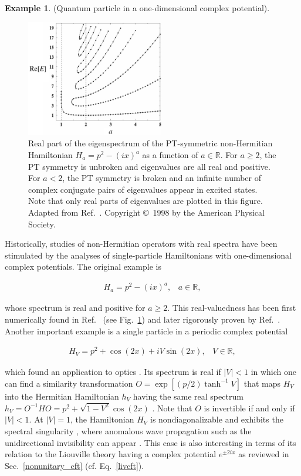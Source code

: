 \documentclass{tADP2e}
\theoremstyle{plain}
\newcommand{\eqn}[1]{
\begin{eqnarray}
	#1
\end{eqnarray}
}
\theoremstyle{plain}
\theoremstyle{definition}
\newtheorem{example}{Example}[section]
\newcommand{\exmp}[1]{
\begin{example}
	#1
\end{example}
}
\begin{document}
\exmp{\label{phparticle}(Quantum particle in a one-dimensional complex potential).
\begin{figure}
\begin{center}
\includegraphics[width=6cm]{./Figures/fig_2_bender.pdf}
\end{center}
\caption{Real part of the eigenspectrum of the PT-symmetric non-Hermitian Hamiltonian $H_{a}=p^2-(ix)^a$ as a function of $a\in{\mathbb R}$. For $a\geq 2$, the PT symmetry is unbroken and eigenvalues are all real and positive. For $a< 2$, the PT symmetry is broken and an infinite number of complex conjugate pairs of eigenvalues appear in  excited states. Note that only real parts of eigenvalues are plotted in this figure. Adapted from Ref.~\cite{BCM98}. Copyright \copyright\,  1998 by the American Physical Society.
\label{fig:2bender}
}
\end{figure}
Historically, studies of non-Hermitian operators with real spectra have been stimulated by the analyses of single-particle Hamiltonians with one-dimensional complex potentials. The original example is
\eqn{\label{benderham}
H_{a}=p^2-(ix)^a,\;\;\;a\in {\mathbb R},
}
whose spectrum is real and positive for $a\geq 2$. This real-valuedness has been first numerically found in Ref.~\cite{BCM98} (see Fig.~\ref{fig:2bender}) and later rigorously proven by Ref.~\cite{PD01}. Another important example is a single particle in a periodic complex potential 
\eqn{\label{singlecossin}
H_{V}=p^2+\cos(2x)+iV\sin(2x),\;\;\;V\in {\mathbb R},
}
which found an application to optics \cite{KGM08}. 
Its spectrum is real if $|V|<1$ in which one can find a similarity transformation $O=\exp[(p/2)\tanh^{-1}V]$ that maps $H_V$ into the Hermitian Hamiltonian $h_V$ having the same real spectrum $h_V=O^{-1}HO=p^2+\sqrt{1-V^2}\cos(2x)$ \cite{BM10}. Note that $O$ is invertible if and only if  $|V|<1$. At $|V|=1$, the Hamiltonian $H_V$ is nondiagonalizable and exhibits the spectral singularity \cite{AM09}, where anomalous wave propagation such as the unidirectional invisibility can appear \cite{LZ11}. This case is also interesting in terms of its relation to the Liouville theory having a complex potential $e^{\pm2ix}$ as reviewed in Sec.~\ref{nonunitary_cft} (cf. Eq.~\eqref{livcft}). 

}
\end{document}
